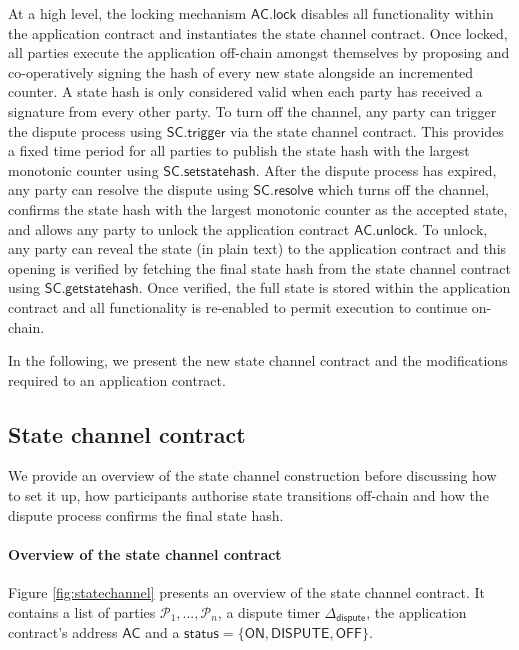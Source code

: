 \documentclass{llncs}
\newcommand{\chanstatus}{\mathsf{status}}
\newcommand{\chanon}{\mathsf{ON}}
\newcommand{\chandispute}{\mathsf{DISPUTE}}
\newcommand{\chanoff}{\mathsf{OFF}}
\newcommand{\participant}{\mathcal{P}}
\newcommand{\statechanneldispute}{\mathsf{SC}.\mathsf{trigger}}
\newcommand{\statechannelsetstate}{\mathsf{SC}.\mathsf{setstatehash}}
\newcommand{\statechannelresolve}{\mathsf{SC}.\mathsf{resolve}}
\newcommand{\statechannelgetcommitment}{\mathsf{SC}.\mathsf{getstatehash}}
\newcommand{\appcontract}{\mathsf{AC}}
\newcommand{\applock}{\mathsf{AC.lock}}
\newcommand{\appunlock}{\mathsf{AC.unlock}}
\newcommand{\timerdispute}{\mathsf{\Delta}_{\mathsf{dispute}}}
\begin{document}
At a high level, the locking mechanism $\applock$ disables all functionality within the application contract and instantiates the state channel contract. 
Once locked, all parties execute the application off-chain amongst themselves by proposing  and co-operatively signing the hash of every new state alongside an incremented counter. 
A state hash is only considered valid when each party has received a signature from every other party. 
To turn off the channel, any party can trigger the dispute process using $\statechanneldispute$ via the state channel contract.
This provides  a fixed time period  for all parties to publish the state hash with the largest monotonic counter using $\statechannelsetstate$. 
After the dispute process has expired, any party can resolve the dispute using $\statechannelresolve$ which turns off the channel, confirms the state hash with the largest monotonic counter as the accepted state, and allows any party to unlock the application contract $\appunlock$. 
To unlock, any party can reveal the state (in plain text) to the application contract and this opening is verified by fetching the final state hash from the state channel contract using  $\statechannelgetcommitment$. 
Once verified, the full state is stored within the application contract and all functionality is re-enabled to permit execution to continue on-chain. 

In the following, we present the new state channel contract and the modifications required to an application contract. 


\subsection{State channel contract}


We provide an overview of the state channel construction before discussing how to set it up, how participants authorise state transitions off-chain and how the dispute process confirms the final state hash. 

\paragraph{Overview of the state channel contract} 
Figure \ref{fig:statechannel} presents an overview of the state channel contract. 
It contains a list of parties $\participant_{1},...,\participant_{n}$, a dispute timer $\timerdispute$, the application contract's address $\appcontract$ and a  $\chanstatus = \{\chanon, \chandispute, \chanoff\}.$
\end{document}
